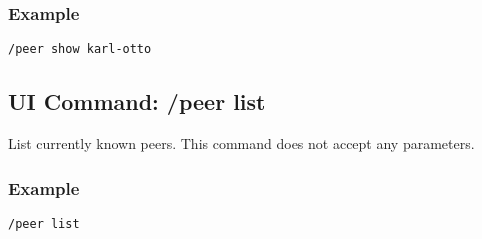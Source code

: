\subsubsection{Example}
\begin{verbatim}
/peer show karl-otto
\end{verbatim}
\subsection{UI Command: /peer list}
List currently known peers. This command does not accept any parameters.

\subsubsection{Example}
\begin{verbatim}
/peer list
\end{verbatim}
% 
